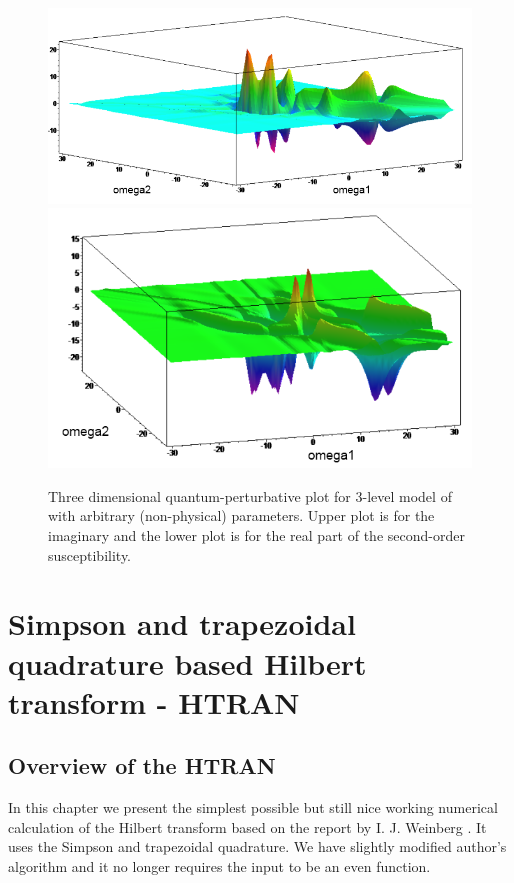 \documentclass[12pt,twoside,a4paper]{article}
\numberwithin{equation}{subsection}
\numberwithin{figure}{subsection}
\begin{document}
\begin{figure} 
  \includegraphics[width=150mm]{img/qp_3da.png} \\
  \includegraphics[width=150mm]{img/qp_3db.png}
  \caption{Three dimensional quantum-perturbative plot for 3-level model of with arbitrary (non-physical) parameters. Upper plot is for the imaginary and the lower plot is for the real part of the second-order susceptibility.
  \label{fig:qp_3d}}
\end{figure}
   
\section{Simpson and trapezoidal quadrature based Hilbert transform - HTRAN} \label{chap:htran}

\subsection{Overview of the HTRAN} \label{chap:htran_overview}

In this chapter we present the simplest possible but still nice working numerical calculation of the Hilbert transform based on the report by I. J. Weinberg \cite{weinberg_hilbert}. It uses the Simpson and trapezoidal quadrature. We have slightly modified author's algorithm and it no longer requires the input to be an even function.
\end{document}

